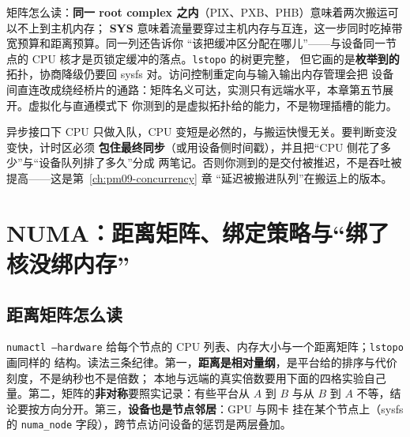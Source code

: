 \documentclass[12pt,a4paper,fontset=fandol]{ctexbook}
\newcommand{\Tp}[1]{\texttt{#1}}
\newcommand{\Bk}{\discretionary{}{}{}}
\newcommand{\Lang}[1]{\textsf{#1}}
\newcommand{\MCpu}{\Lang{CPU}}
\begin{document}
矩阵怎么读：\textbf{同一 root complex 之内}（PIX、PXB、PHB）意味着两次搬运可以不上到主机内存；
\textbf{SYS} 意味着流量要穿过主机内存与互连，这一步同时吃掉带宽预算和距离预算。同一列还告诉你
``该把缓冲区分配在哪儿''——与设备同一节点的 CPU 核才是页锁定缓冲的落点。\Tp{lstopo} 的树更完整，
但它画的是\textbf{枚举到的}拓扑，协商降级仍要回 sysfs 对。访问控制重定向与输入输出内存管理会把
设备间直连改成绕经桥片的通路：矩阵名义可达，实测只有远端水平，本章第五节展开。虚拟化与直通模式下
你测到的是虚拟拓扑给的能力，不是物理插槽的能力。

\begin{warning}[title={用 CPU 时间证明``拷贝变快了''}]
异步接口下 CPU 只做入队，\MCpu{} 变短是必然的，与搬运快慢无关。要判断变没变快，计时区必须
\textbf{包住最终同步}（或用设备侧时间戳），并且把``CPU 侧花了多少''与``设备队列排了多久''分成
两笔记。否则你测到的是交付被推迟，不是吞吐被提高——这是第~\ref{ch:pm09-concurrency} 章
``延迟被搬进队列''在搬运上的版本。
\end{warning}

\section{NUMA：距离矩阵、绑定策略与``绑了核没绑内存''}
\label{sec:pm12-numa}

\subsection*{距离矩阵怎么读}
\Tp{numactl{\Bk} --hardware} 给每个节点的 CPU 列表、内存大小与一个距离矩阵；\Tp{lstopo} 画同样的
结构。读法三条纪律。第一，\textbf{距离是相对量纲}，是平台给的排序与代价刻度，不是纳秒也不是倍数；
本地与远端的真实倍数要用下面的四格实验自己量。第二，矩阵的\textbf{非对称}要照实记录：有些平台从
$A$ 到 $B$ 与从 $B$ 到 $A$ 不等，结论要按方向分开。第三，\textbf{设备也是节点邻居}：GPU 与网卡
挂在某个节点上（sysfs 的 \Tp{numa{\Bk}\_node} 字段），跨节点访问设备的惩罚是两层叠加。
\end{document}

